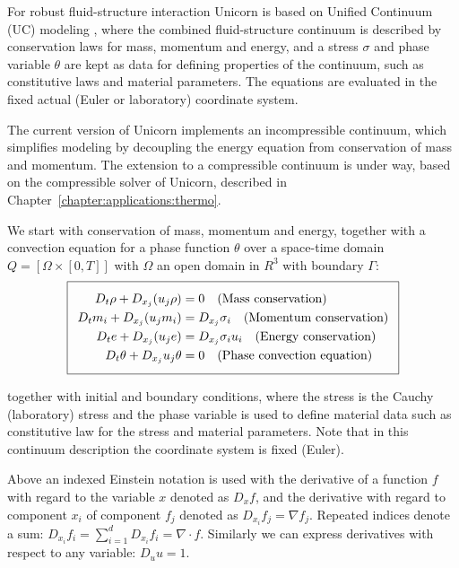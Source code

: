 For robust fluid-structure interaction Unicorn is based on Unified
Continuum (UC) modeling \cite{HoffmanJanssonLoggEtAl2009}, where the
combined fluid-structure continuum is described by conservation laws
for mass, momentum and energy, and a stress $\sigma$ and phase
variable $\theta$ are kept as data for defining properties of the
continuum, such as constitutive laws and material parameters. The
equations are evaluated in the fixed actual (Euler or laboratory)
coordinate system.

The current version of Unicorn implements an incompressible continuum,
which simplifies modeling by decoupling the energy equation from
conservation of mass and momentum. The extension to a compressible
continuum is under way, based on the compressible solver of Unicorn,
described in Chapter~\ref{chapter:applications:thermo}.

We start with conservation of mass, momentum and energy, together with
a convection equation for a phase function $\theta$ over a space-time
domain $Q = [\Omega \times [0, T]]$ with $\Omega$ an open domain in
$R^3$ with boundary $\Gamma$:
\begin{equation}
  \addtolength{\fboxsep}{5pt}
  \boxed{
    \begin{split}\label{eq:TotalModel}
      D_t \rho + D_{x_j} (u_j \rho) &= 0
      \quad \text{(Mass conservation)}\\
      D_t m_i + D_{x_j} (u_j m_i) &= D_{x_j} \sigma_i
      \quad \text{(Momentum conservation)}\\
      D_t e + D_{x_j} (u_j e) &= D_{x_j} \sigma_i u_i
      \quad \text{(Energy conservation)}\\
      D_t \theta + D_{x_j} u_j \theta &= 0
      \quad \text{(Phase convection equation)}
    \end{split}
  }
\end{equation}

together with initial and boundary conditions, where the stress is the
Cauchy (laboratory) stress and the phase variable is used to define
material data such as constitutive law for the stress and material
parameters. Note that in this continuum description the coordinate
system is fixed (Euler).

Above an indexed Einstein notation is used with the derivative of a
function $f$ with regard to the variable $x$ denoted as $D_x f$, and
the derivative with regard to component $x_i$ of component $f_j$
denoted as $D_{x_i} f_j = \nabla f_j$. Repeated indices denote a sum:
$D_{x_i} f_i = \sum_{i=1}^d D_{x_i} f_i = \nabla \cdot f$. Similarly
we can express derivatives with respect to any variable: $D_u u = 1$.

